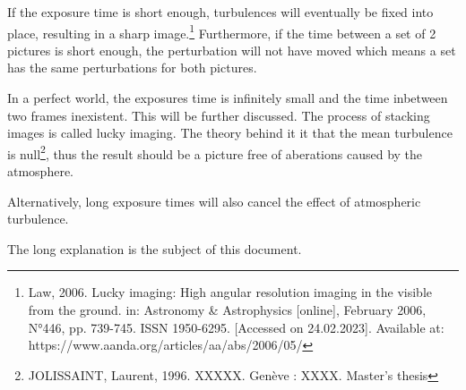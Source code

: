 If the exposure time is short enough, turbulences will eventually be fixed into place, resulting in a sharp image.\footnote{\cite{Law_lucky} Law, 2006. Lucky imaging: High angular resolution imaging in the visible from the ground. in: Astronomy \& Astrophysics [online], February 2006, N°446, pp. 739-745. ISSN
1950-6295. [Accessed on 24.02.2023]. Available at: https://www.aanda.org/articles/aa/abs/2006/05/} Furthermore, if the time between a set of 2 pictures is short enough, the perturbation will not have moved which means a set has the same perturbations for both pictures.

In a perfect world, the exposures time is infinitely small and the time inbetween two frames inexistent. This will be further discussed.
The process of stacking images is called lucky imaging. The theory behind it it that the mean turbulence is null\footnote{\cite{JOLISSAINT_master} JOLISSAINT, Laurent, 1996. XXXXX. Genève : XXXX. Master's thesis}, thus the result should be a picture free of aberations caused by the atmosphere.

Alternatively, long exposure times will also cancel the effect of atmospheric turbulence.

The long explanation is the subject of this document.

